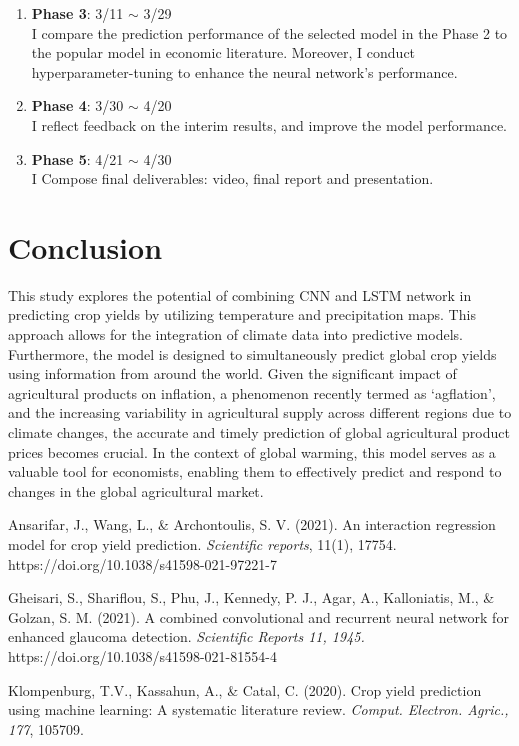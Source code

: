 \documentclass[11pt, oneside]{article}   	%
\begin{document}
\begin{enumerate}
\item \textbf{Phase 3}: 3/11 $\sim$ 3/29 \\
I compare the prediction performance of the selected model in the Phase 2 to the popular model in economic literature. Moreover, I conduct hyperparameter-tuning to enhance the neural network's performance.

\item \textbf{Phase 4}: 3/30 $\sim$ 4/20 \\
I reflect feedback on the interim results, and improve the model performance.

\item \textbf{Phase 5}: 4/21 $\sim$ 4/30 \\
I Compose final deliverables: video, final report and presentation.
\end{enumerate}

\section*{Conclusion}

This study explores the potential of combining CNN and LSTM network in predicting crop yields by utilizing temperature and precipitation maps. This approach allows for the integration of climate data into predictive models. Furthermore, the model is designed to simultaneously predict global crop yields using information from around the world. Given the significant impact of agricultural products on inflation, a phenomenon recently termed as ‘agflation’, and the increasing variability in agricultural supply across different regions due to climate changes, the accurate and timely prediction of global agricultural product prices becomes crucial. In the context of global warming, this model serves as a valuable tool for economists, enabling them to effectively predict and respond to changes in the global agricultural market.

\begin{thebibliography}{9}

Ansarifar, J., Wang, L., \& Archontoulis, S. V. (2021). An interaction regression model for crop yield prediction. \textit{Scientific reports}, 11(1), 17754. https://doi.org/10.1038/s41598-021-97221-7

Gheisari, S., Shariflou, S., Phu, J., Kennedy, P. J., Agar, A., Kalloniatis, M., \& Golzan, S. M. (2021). A combined convolutional and recurrent neural network for enhanced glaucoma detection. \textit{Scientific Reports 11, 1945.} https://doi.org/10.1038/s41598-021-81554-4

Klompenburg, T.V., Kassahun, A., \& Catal, C. (2020). Crop yield prediction using machine learning: A systematic literature review. \textit{Comput. Electron. Agric., 177}, 105709.

\end{thebibliography}
\end{document}
